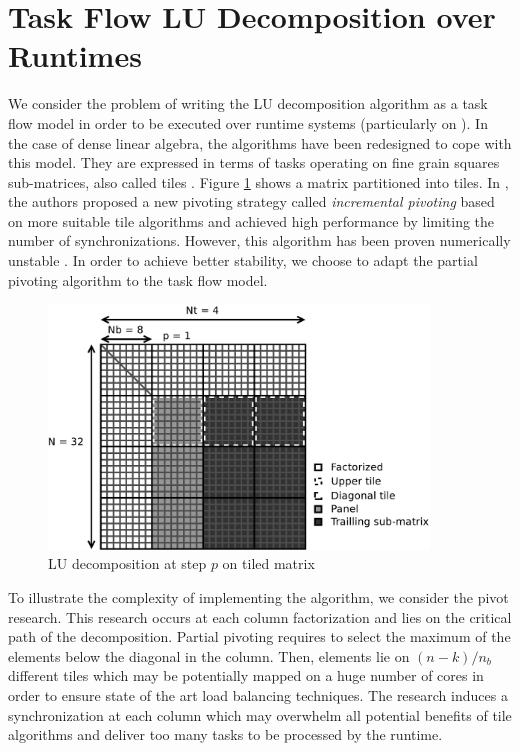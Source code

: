 \section{Task Flow LU Decomposition over Runtimes \label{task_flow_lu}}
We consider the problem of writing the LU decomposition algorithm as a task flow model in order to be executed over runtime systems (particularly on \dague). In the case of dense linear algebra, the algorithms have been redesigned to cope with this model. They are expressed in terms of tasks operating on fine grain squares sub-matrices, also called tiles \cite{conf/para/ButtariDKLLT06,ChanEtAl07b}. Figure \ref{fig:tiled_matrix} shows a matrix partitioned into tiles. In \cite{Buttari09}, the authors proposed a new pivoting strategy called \emph{incremental pivoting} based on \cite{Quintana-Orti:2009:ULF} more suitable tile algorithms and achieved high performance by limiting the number of synchronizations. However, this algorithm has been proven numerically unstable \cite{journals/siammax/GrigoriDX11}. In order to achieve better stability, we choose to adapt the partial pivoting algorithm to the task flow model.

\begin{figure}[!ht]
\centering
\includegraphics[width=0.9\textwidth]{figures/tiled_matrix.pdf}
\caption{LU decomposition at step $p$ on tiled matrix \label{fig:tiled_matrix}}
\end{figure}

To illustrate the complexity of implementing the algorithm, we consider the pivot research. This research occurs at each column factorization and lies on the critical path of the decomposition. Partial pivoting requires to select the maximum of the elements below the diagonal in the column. Then, elements lie on $(n-k)/n_b$ different tiles which may be potentially mapped on a huge number of cores in order to ensure state of the art load balancing techniques. The research induces a synchronization at each column which may overwhelm all potential benefits of tile algorithms and deliver too many tasks to be processed by the runtime.

